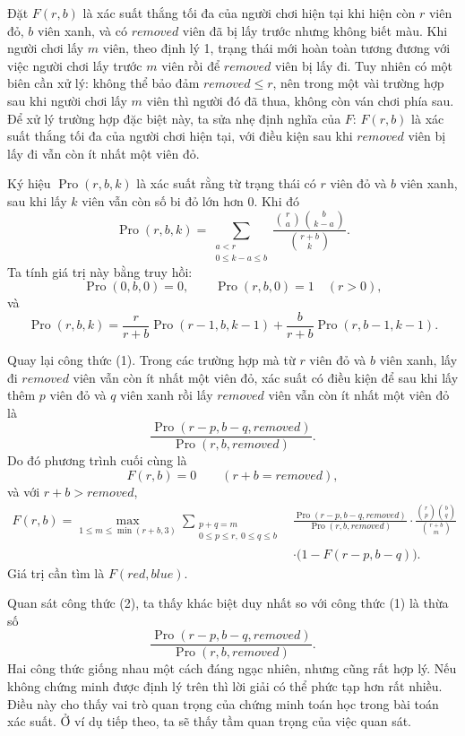 \documentclass[11pt]{article}
\begin{document}
Đặt \(F(r,b)\) là xác suất thắng tối đa của người chơi hiện tại khi hiện còn
\(r\) viên đỏ, \(b\) viên xanh, và có \(\mathit{removed}\) viên đã bị lấy
trước nhưng không biết màu. Khi người chơi lấy \(m\) viên, theo định lý 1,
trạng thái mới hoàn toàn tương đương với việc người chơi lấy trước \(m\) viên
rồi để \(\mathit{removed}\) viên bị lấy đi. Tuy nhiên có một biên cần xử lý:
không thể bảo đảm \(\mathit{removed}\le r\), nên trong một vài trường hợp sau
khi người chơi lấy \(m\) viên thì người đó đã thua, không còn ván chơi phía
sau. Để xử lý trường hợp đặc biệt này, ta sửa nhẹ định nghĩa của \(F\):
\(F(r,b)\) là xác suất thắng tối đa của người chơi hiện tại, với điều kiện sau
khi \(\mathit{removed}\) viên bị lấy đi vẫn còn ít nhất một viên đỏ.

Ký hiệu \(\operatorname{Pro}(r,b,k)\) là xác suất rằng từ trạng thái có \(r\)
viên đỏ và \(b\) viên xanh, sau khi lấy \(k\) viên vẫn còn số bi đỏ lớn hơn
\(0\). Khi đó
\[
  \operatorname{Pro}(r,b,k)
  =
  \sum_{\substack{a<r\\0\le k-a\le b}}
  \frac{\binom{r}{a}\binom{b}{k-a}}{\binom{r+b}{k}}.
\]
Ta tính giá trị này bằng truy hồi:
\[
  \operatorname{Pro}(0,b,0)=0,\qquad
  \operatorname{Pro}(r,b,0)=1\quad(r>0),
\]
và
\[
  \operatorname{Pro}(r,b,k)
  =
  \frac{r}{r+b}\operatorname{Pro}(r-1,b,k-1)
  +\frac{b}{r+b}\operatorname{Pro}(r,b-1,k-1).
\]

Quay lại công thức (1). Trong các trường hợp mà từ \(r\) viên đỏ và \(b\) viên
xanh, lấy đi \(\mathit{removed}\) viên vẫn còn ít nhất một viên đỏ, xác suất
có điều kiện để sau khi lấy thêm \(p\) viên đỏ và \(q\) viên xanh rồi lấy
\(\mathit{removed}\) viên vẫn còn ít nhất một viên đỏ là
\[
  \frac{\operatorname{Pro}(r-p,b-q,\mathit{removed})}
       {\operatorname{Pro}(r,b,\mathit{removed})}.
\]
Do đó phương trình cuối cùng là
\[
  F(r,b)=0\qquad (r+b=\mathit{removed}),
\]
và với \(r+b>\mathit{removed}\),
\[
\begin{aligned}
F(r,b)=
\max_{1\le m\le \min(r+b,3)}
\sum_{\substack{p+q=m\\0\le p\le r,\ 0\le q\le b}}
&
\frac{\operatorname{Pro}(r-p,b-q,\mathit{removed})}
     {\operatorname{Pro}(r,b,\mathit{removed})}
\cdot
\frac{\binom{r}{p}\binom{b}{q}}{\binom{r+b}{m}}\\
&\cdot \bigl(1-F(r-p,b-q)\bigr).
\end{aligned}
\tag{2}
\]
Giá trị cần tìm là \(F(\mathit{red},\mathit{blue})\).

Quan sát công thức (2), ta thấy khác biệt duy nhất so với công thức (1) là
thừa số
\[
  \frac{\operatorname{Pro}(r-p,b-q,\mathit{removed})}
       {\operatorname{Pro}(r,b,\mathit{removed})}.
\]
Hai công thức giống nhau một cách đáng ngạc nhiên, nhưng cũng rất hợp lý. Nếu
không chứng minh được định lý trên thì lời giải có thể phức tạp hơn rất
nhiều. Điều này cho thấy vai trò quan trọng của chứng minh toán học trong bài
toán xác suất. Ở ví dụ tiếp theo, ta sẽ thấy tầm quan trọng của việc quan sát.
\end{document}
